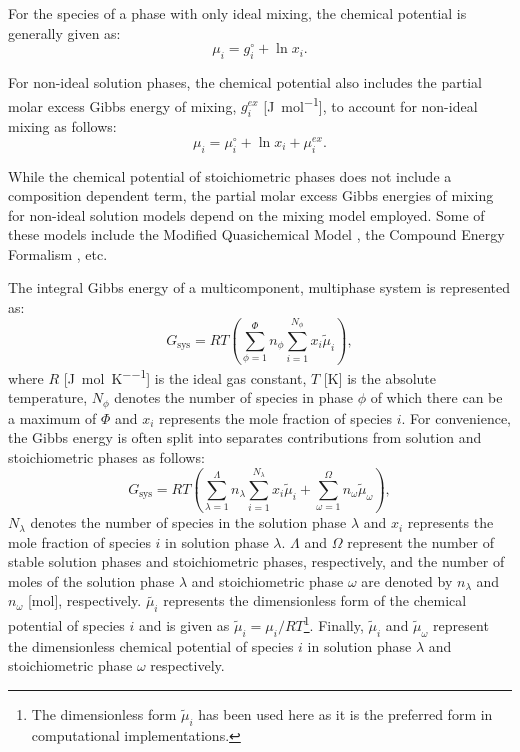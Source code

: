 	For the species of a phase with only ideal mixing, the chemical potential is generally given as:
    	\begin{equation}
        		\mu_{i} = g_{i}^\circ + \ln x_{i}.
    	\end{equation}

	For non-ideal solution phases, the chemical potential also includes the partial molar excess Gibbs energy of mixing, $g_{i}^{ex}$ [\si{\joule \per \mole}], to account for non-ideal mixing as follows:
    	\begin{equation}\label{eq:mu_ex}
        		\mu_{i} = \mu_{i}^\circ + \ln x_{i} + \mu_{i}^{ex}.
    	\end{equation}

    	While the chemical potential of stoichiometric phases does not include a composition dependent term, the partial molar excess Gibbs energies of mixing for non-ideal solution models depend on the mixing model employed. Some of these models include the Modified Quasichemical Model \cite{Pelton00,Pelton01,Chartrand01,Pelton01b,Lambotte11}, the Compound Energy Formalism \cite{Hillert01}, etc.

	The integral Gibbs energy of a multicomponent, multiphase system is represented as:
	\begin{equation}\label{eqn:integralGibbs1}
        		G_\text{sys} = RT \left ( \sum_{\phi=1}^{\Phi} n_{\phi} \sum_{i=1}^{N_{\phi}}x_{i}\tilde{\mu}_i \right ),
    	\end{equation}
	where $R$ [\si{\joule \per \mole \per \kelvin}] is the ideal gas constant, $T$ [\si{\kelvin}] is the absolute temperature, $N_{\phi}$ denotes the number of species in phase $\phi$ of which there can be a maximum of $\Phi$ and $x_{i}$ represents the mole fraction of species $i$. For convenience, the Gibbs energy is often split into separates contributions from solution and stoichiometric phases as follows:
    	\begin{equation}\label{eqn:integralGibbs}
        		G_\text{sys} = RT \left ( \sum_{\lambda=1}^{\Lambda} n_{\lambda} \sum_{i=1}^{N_{\lambda}}x_{i}\tilde{\mu}_i + \sum_{\omega=1}^{\Omega} n_{\omega} \tilde{\mu}_{\omega} \right ),
    	\end{equation}
    	$N_{\lambda}$ denotes the number of species in the solution phase $\lambda$ and $x_{i}$ represents the mole fraction of species $i$ in solution phase $\lambda$. $\Lambda$ and $\Omega$ represent the number of stable solution phases and stoichiometric phases, respectively, and the number of moles of the solution phase $\lambda$ and stoichiometric phase $\omega$ are denoted by $n_\lambda$ and $n_\omega$ [\si{\mole}], respectively. $\tilde{\mu_i}$ represents the dimensionless form of the chemical potential of species $i$ and is given as $\tilde{\mu}_i = \mu_i / RT$\footnote{The dimensionless form $\tilde{\mu}_i$ has been used here as it is the preferred form in computational implementations.}. Finally, $\tilde{\mu}_i$ and $\tilde{\mu}_\omega$ represent the dimensionless chemical potential of species $i$ in solution phase $\lambda$ and stoichiometric phase $\omega$ respectively.


